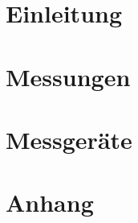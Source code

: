 \documentclass[a4paper,10pt,fleqn]{article}
\begin{document}



\section{Einleitung}


\section{Messungen}















%
%


\section{Messgeräte}




\clearpage
\section{Anhang}
\appendix

\end{document}
